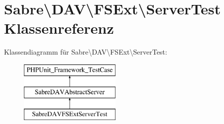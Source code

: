\hypertarget{class_sabre_1_1_d_a_v_1_1_f_s_ext_1_1_server_test}{}\section{Sabre\textbackslash{}D\+AV\textbackslash{}F\+S\+Ext\textbackslash{}Server\+Test Klassenreferenz}
\label{class_sabre_1_1_d_a_v_1_1_f_s_ext_1_1_server_test}
Klassendiagramm für Sabre\textbackslash{}D\+AV\textbackslash{}F\+S\+Ext\textbackslash{}Server\+Test\+:\begin{figure}[H]
\begin{center}
\leavevmode
\includegraphics[height=3.000000cm]{class_sabre_1_1_d_a_v_1_1_f_s_ext_1_1_server_test}
\end{center}
\end{figure}
